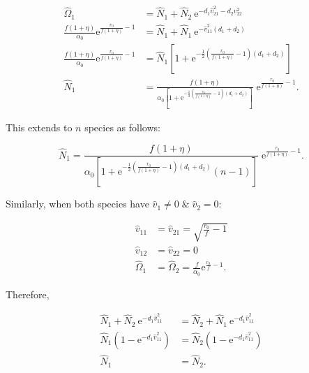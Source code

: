 \begin{equation} \label{eq:two-axes-v1-v2-equal-N}
\begin{split}
    \hat\Omega_1 &= \hat{N}_1 + \hat{N}_2 \: \text{e}^{-d_1 \hat{v}_{21}^2 -
        d_2 v_{22}^2} \\
    \frac{f (1 + \eta)}{\alpha_0} \text{e}^{\frac{r_0}{f (1 + \eta)} - 1} &=
        \hat{N}_1 + \hat{N}_1 \: \text{e}^{- \hat{v}_{11}^2 (d_1 + d_2)} \\
    \frac{f (1 + \eta)}{\alpha_0} \text{e}^{\frac{r_0}{f (1 + \eta)} - 1} &=
        \hat{N}_1 \left[ 1 + \text{e}^{- \frac{1}{2} \left(
            \frac{r_0}{f (1 + \eta)} - 1 \right) (d_1 + d_2)} \right] \\
    \hat{N}_1 &= \frac{f (1 + \eta)}{\alpha_0  \left[ 1 + \text{e}^{- \frac{1}{2} \left(
        \frac{r_0}{f (1 + \eta)} - 1 \right) (d_1 + d_2)} \right] } \;
        \text{e}^{\frac{r_0}{f (1 + \eta)} - 1}
    \text{.}
\end{split}
\end{equation}


This extends to $n$ species as follows:

\begin{equation} \label{eq:two-axes-v1-v2-equal-N-n-species}
    \hat{N}_1 = \frac{f (1 + \eta)}{\alpha_0  \left[ 1 + \text{e}^{- \frac{1}{2} \left(
        \frac{r_0}{f (1 + \eta)} - 1 \right) (d_1 + d_2)}  (n - 1) \right] } \;
        \text{e}^{\frac{r_0}{f (1 + \eta)} - 1}
    \text{.}
\end{equation}




Similarly, when both species have $\hat{v}_1 \ne 0 \; \& \; \hat{v}_2 = 0$:

\begin{equation*}
\begin{split}
    \hat{v}_{11} &= \hat{v}_{21} = \sqrt{ \frac{ r_0 }{ f } - 1 } \\
    \hat{v}_{12} &= \hat{v}_{22} = 0 \\
    \hat\Omega_1 &= \hat\Omega_2 = \frac{f}{\alpha_0} \textrm{e}^{\frac{r_0}{f} - 1}
    \text{.}
\end{split}
\end{equation*}

\noindent Therefore,

\begin{equation} \label{eq:two-axes-v1-nonzero-v2-zero-N1-N2}
\begin{split}
    \hat{N}_1 + \hat{N}_2 \: \text{e}^{- d_1 \hat{v}_{11}^2 } &=
        \hat{N}_2 + \hat{N}_1 \: \text{e}^{- d_1 \hat{v}_{11}^2 } \\
    \hat{N}_1 \left( 1 - \text{e}^{- d_1 \hat{v}_{11}^2 } \right) &=
        \hat{N}_2 \left( 1 - \text{e}^{- d_1 \hat{v}_{11}^2 } \right) \\
    \hat{N}_1 &= \hat{N}_2
    \text{.}
\end{split}
\end{equation}

